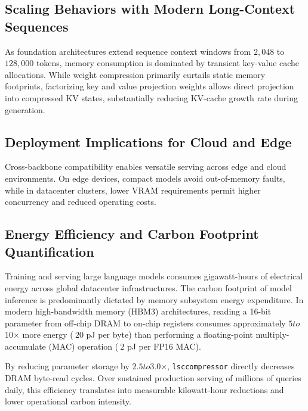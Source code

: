 \subsection{Scaling Behaviors with Modern Long-Context Sequences}
As foundation architectures extend sequence context windows from $2{,}048$ to $128{,}000$ tokens, memory consumption is dominated by transient key-value cache allocations. While weight compression primarily curtails static memory footprints, factorizing key and value projection weights allows direct projection into compressed KV states, substantially reducing KV-cache growth rate during generation.

\subsection{Deployment Implications for Cloud and Edge}
Cross-backbone compatibility enables versatile serving across edge and cloud environments. On edge devices, compact models avoid out-of-memory faults, while in datacenter clusters, lower VRAM requirements permit higher concurrency and reduced operating costs.

\subsection{Energy Efficiency and Carbon Footprint Quantification}
Training and serving large language models consumes gigawatt-hours of electrical energy across global datacenter infrastructures. The carbon footprint of model inference is predominantly dictated by memory subsystem energy expenditure. In modern high-bandwidth memory (HBM3) architectures, reading a 16-bit parameter from off-chip DRAM to on-chip registers consumes approximately $5$\times$ to $10$\times$ more energy ($~20$ pJ per byte) than performing a floating-point multiply-accumulate (MAC) operation ($~2$ pJ per FP16 MAC).

By reducing parameter storage by $2.5$\times$ to $3.0$\times$, \texttt{lsccompressor} directly decreases DRAM byte-read cycles. Over sustained production serving of millions of queries daily, this efficiency translates into measurable kilowatt-hour reductions and lower operational carbon intensity.
